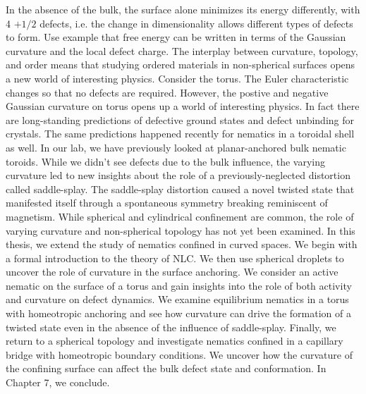 In the absence of the bulk, the surface alone minimizes its energy differently, with 4 $+1/2$ defects, i.e. the change in dimensionality allows different types of defects to form.
Use example that free energy can be written in terms of the Gaussian curvature and the local defect charge.
The interplay between curvature, topology, and order means that studying ordered materials in non-spherical surfaces opens a new world of interesting physics.
Consider the torus.
The Euler characteristic changes so that no defects are required.
However, the postive and negative Gaussian curvature on torus opens up a world of interesting physics.
In fact there are long-standing predictions of defective ground states and defect unbinding for crystals.
The same predictions happened recently for nematics in a toroidal shell as well.
In our lab, we have previously looked at planar-anchored bulk nematic toroids.
While we didn't see defects due to the bulk influence, the varying curvature led to new insights about the role of a previously-neglected distortion called saddle-splay.
The saddle-splay distortion caused a novel twisted state that manifested itself through a spontaneous symmetry breaking reminiscent of magnetism.
While spherical and cylindrical confinement are common, the role of varying curvature and non-spherical topology has not yet been examined.
In this thesis, we extend the study of nematics confined in curved spaces.
We begin with a formal introduction to the theory of NLC.
We then use spherical droplets to uncover the role of curvature in the surface anchoring.
We consider an active nematic on the surface of a torus and gain insights into the role of both activity and curvature on defect dynamics.
We examine equilibrium nematics in a torus with homeotropic anchoring and see how curvature can drive the formation of a twisted state even in the absence of the influence of saddle-splay.
Finally, we return to a spherical topology and investigate nematics confined in a capillary bridge with homeotropic boundary conditions.
We uncover how the curvature of the confining surface can affect the bulk defect state and conformation.
In Chapter 7, we conclude.
